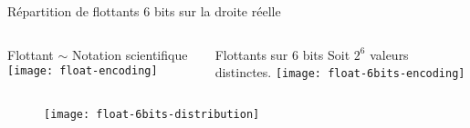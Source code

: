 \documentclass[10pt]{beamer}
\begin{document}
 \questionSlide

 \appendix
 \backupSlides


\begin{frame}{Répartition de flottants 6 bits sur la droite réelle}

\begin{columns}[t]
  \begin{column}{0.48\textwidth}
    \begin{block}{Flottant $\sim$ Notation scientifique}
      \texttt{[image: float-encoding]}
    \end{block}
  \end{column}
  \begin{column}{0.48\textwidth}
    \begin{block}{Flottants sur 6 bits}
      Soit $2^6$ valeurs distinctes.
      \texttt{[image: float-6bits-encoding]}
    \end{block}
  \end{column}
\end{columns}

\begin{figure}[b]
  \centering
  \texttt{[image: float-6bits-distribution]}
\end{figure}

\end{frame}







\end{document}
